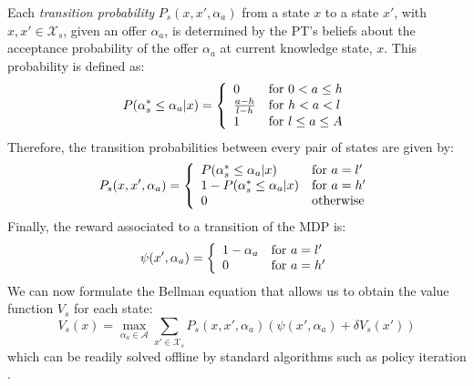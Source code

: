 Each \textit{transition probability} $P_s(x,x',\alpha_a)$ from a state $x$ to a state $x'$, with $x, x' \in \mathcal{X}_s$, given an offer $\alpha_a$, is determined by the PT's beliefs about the acceptance probability of the offer $\alpha_a$ at current knowledge state, $x$. This probability is defined as:
\begin{equation}
 P(\alpha_s^* \leq \alpha_a|x) = \left\{ 
  \begin{array}{l l}
    0 & \text{for } 0 < a \leq h\\
    \frac{a-h}{l-h} & \text{for } h < a < l \\
    1 & \text{for } l \leq a \leq A 
  \end{array} \right.
\end{equation}
Therefore, the transition probabilities between every pair of states are given by:
\begin{equation}
 P_s(x,x',\alpha_a) = \left\{ 
  \begin{array}{l l}
    P(\alpha_s^* \leq\alpha_a|x) & \text{for } a = l'\\
    1 - P(\alpha_s^* \leq\alpha_a|x) & \text{for } a = h'\\
    0 & \text{otherwise}
  \end{array} \right.
\end{equation}
Finally, the reward associated to a transition of the MDP is: 
\begin{equation}
\psi(x',\alpha_a) = \left\{ 
  \begin{array}{l l}
    1 - \alpha_a & \text{for } a = l'\\
    0 & \text{for } a = h'\\
  \end{array} \right.
\end{equation}
We can now formulate the Bellman equation that allows us to obtain the value function $V_s$ for each state:
\begin{equation}\label{eq:MDP}
V_s(x) = \max_{\alpha_a \in \mathcal{A}} \sum_{x' \in \mathcal{X}_s} P_s(x,x',\alpha_a)(\psi(x',\alpha_a)+\delta V_s(x'))
\end{equation}
which can be readily solved offline by standard algorithms such as policy iteration \cite{ref:Bertsekas2005}.
